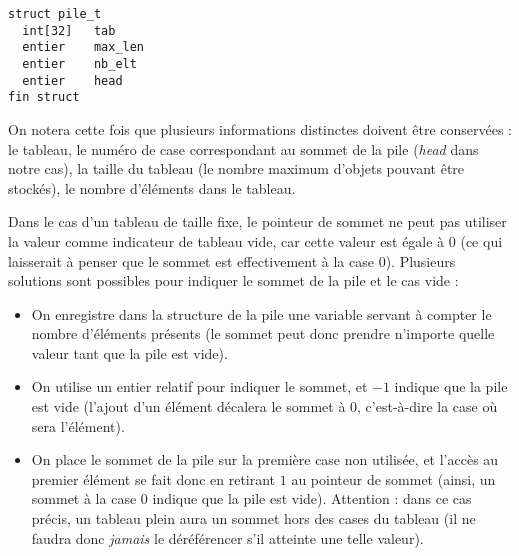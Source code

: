 \documentclass[11pt,a4paper]{article}
\begin{document}
\begin{center}
\begin{lstlisting}[style=algorithmique]
struct pile_t
  int[32]   tab
  entier    max_len
  entier    nb_elt
  entier    head
fin struct \end{lstlisting}
\end{center}

On notera cette fois que plusieurs informations distinctes doivent être conservées : le tableau, le numéro de case correspondant au sommet de la pile (\textit{head} dans notre cas), la taille du tableau (le nombre maximum d'objets pouvant être stockés), le nombre d'éléments dans le tableau.

\medskip

Dans le cas d'un tableau de taille fixe, le pointeur de sommet ne peut pas utiliser la valeur  comme indicateur de tableau vide, car cette valeur est égale à $ 0 $ (ce qui laisserait à penser que le sommet est effectivement à la case 0).
Plusieurs solutions sont possibles pour indiquer le sommet de la pile et le cas vide :

\begin{itemize}
\item On enregistre dans la structure de la pile une variable servant à compter le nombre d'éléments présents (le sommet peut donc prendre n'importe quelle valeur tant que la pile est vide).
\item On utilise un entier relatif pour indiquer le sommet, et $ -1 $ indique que la pile est vide (l'ajout d'un élément décalera le sommet à $ 0 $, c'est-à-dire la case où sera l'élément).
\item On place le sommet de la pile sur la première case non utilisée, et l'accès au premier élément se fait donc en retirant $ 1 $ au pointeur de sommet (ainsi, un sommet à la case $ 0 $ indique que la pile est vide).
Attention : dans ce cas précis, un tableau plein aura un sommet hors des cases du tableau (il ne faudra donc \textit{jamais} le déréférencer s'il atteinte une telle valeur).
\end{itemize}

\bigskip

\end{document}
